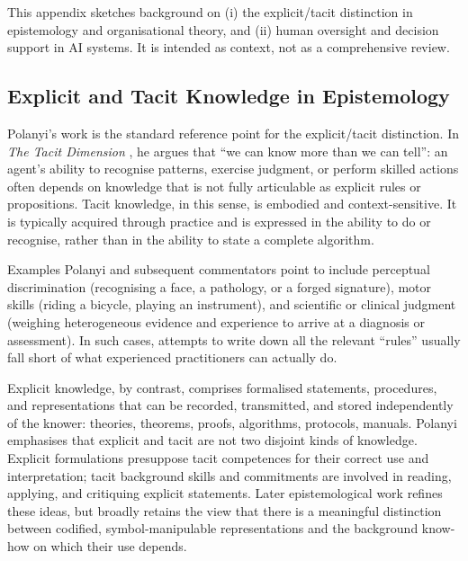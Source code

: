
This appendix sketches background on (i) the explicit/tacit distinction in epistemology and organisational theory, and (ii) human oversight and decision support in AI systems. It is intended as context, not as a comprehensive review.

\subsection{Explicit and Tacit Knowledge in Epistemology}

Polanyi's work is the standard reference point for the explicit/tacit distinction. In \emph{The Tacit Dimension} \cite{Polanyi1966}, he argues that ``we can know more than we can tell'': an agent's ability to recognise patterns, exercise judgment, or perform skilled actions often depends on knowledge that is not fully articulable as explicit rules or propositions. Tacit knowledge, in this sense, is embodied and context-sensitive. It is typically acquired through practice and is expressed in the ability to do or recognise, rather than in the ability to state a complete algorithm.

Examples Polanyi and subsequent commentators point to include perceptual discrimination (recognising a face, a pathology, or a forged signature), motor skills (riding a bicycle, playing an instrument), and scientific or clinical judgment (weighing heterogeneous evidence and experience to arrive at a diagnosis or assessment). In such cases, attempts to write down all the relevant ``rules'' usually fall short of what experienced practitioners can actually do.

Explicit knowledge, by contrast, comprises formalised statements, procedures, and representations that can be recorded, transmitted, and stored independently of the knower: theories, theorems, proofs, algorithms, protocols, manuals. Polanyi emphasises that explicit and tacit are not two disjoint kinds of knowledge. Explicit formulations presuppose tacit competences for their correct use and interpretation; tacit background skills and commitments are involved in reading, applying, and critiquing explicit statements. Later epistemological work refines these ideas, but broadly retains the view that there is a meaningful distinction between codified, symbol-manipulable representations and the background know-how on which their use depends.


